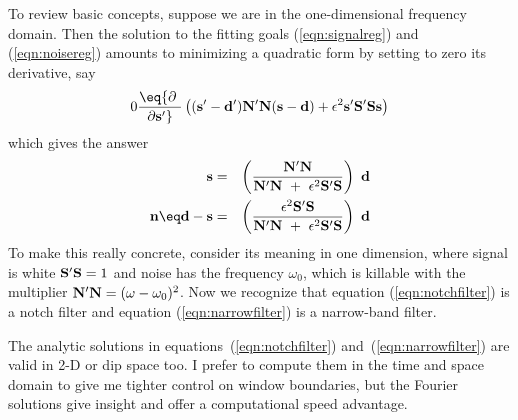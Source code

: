 \par
To review basic concepts,
suppose we are in the one-dimensional frequency domain.
Then the solution to the fitting goals
(\ref{eqn:signalreg})
and
(\ref{eqn:noisereg})
amounts to minimizing a quadratic form
by setting to zero its derivative, say
\begin{equation}
0 \eq
{\partial \ \over \partial \bold s'}
\left(
   (\bold s'-\bold d')\bold N'\bold N(\bold s - \bold d )
+ \epsilon^2 \bold s' \bold S'\bold S \bold s
\right)
\end{equation}
which gives the answer
\begin{eqnarray}
                                                \label{eqn:notchfilter}
\bold s &=&
                \left(
                   \bold N' \bold N
                     \over
                   \bold N' \bold N \ + \ \epsilon^2 \bold S'\bold S 
                \right) \ \bold d
\\
                                                \label{eqn:narrowfilter}
\bold n \eq \bold d - \bold s
&=&
                \left(
                   \epsilon^2 \bold S'\bold S
                     \over
                   \bold N' \bold N \ + \ \epsilon^2 \bold S'\bold S 
                \right) \ \bold d
\end{eqnarray}
To make this really concrete,
consider its meaning in one dimension,
where signal is white
$\bold S'\bold S=1$ and
noise has the frequency $\omega_0$,
which is killable with the multiplier
$\bold N'\bold N=(\omega-\omega_0)^2$.
Now we recognize that equation (\ref{eqn:notchfilter})
is a notch filter and equation (\ref{eqn:narrowfilter})
is a narrow-band filter.
\par
The analytic solutions in equations~(\ref{eqn:notchfilter})
and~(\ref{eqn:narrowfilter})
are valid in 2-D  or dip space too.
I prefer to compute them in the time and space domain
to give me tighter control on window boundaries,
but the Fourier solutions give insight
and offer a computational speed advantage.

